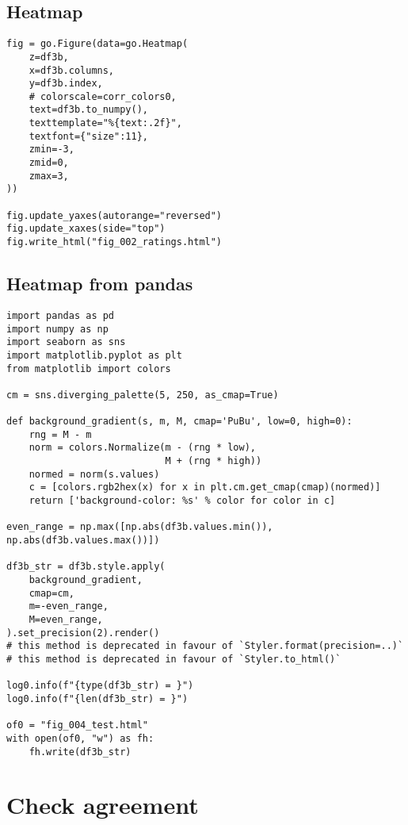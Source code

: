\documentclass[a4paper,10pt,onecolumn,oneside,openright]{article}
\begin{document}
\subsection{Heatmap}
\label{sec:org2fe0089}
\begin{verbatim}
fig = go.Figure(data=go.Heatmap(
    z=df3b,
    x=df3b.columns,
    y=df3b.index,
    # colorscale=corr_colors0,
    text=df3b.to_numpy(),
    texttemplate="%{text:.2f}",
    textfont={"size":11},
    zmin=-3,
    zmid=0,
    zmax=3,
))

fig.update_yaxes(autorange="reversed")
fig.update_xaxes(side="top")
fig.write_html("fig_002_ratings.html")

\end{verbatim}
\subsection{Heatmap from pandas}
\label{sec:org844de83}
\begin{verbatim}
import pandas as pd
import numpy as np
import seaborn as sns
import matplotlib.pyplot as plt
from matplotlib import colors

cm = sns.diverging_palette(5, 250, as_cmap=True)

def background_gradient(s, m, M, cmap='PuBu', low=0, high=0):
    rng = M - m
    norm = colors.Normalize(m - (rng * low),
                            M + (rng * high))
    normed = norm(s.values)
    c = [colors.rgb2hex(x) for x in plt.cm.get_cmap(cmap)(normed)]
    return ['background-color: %s' % color for color in c]

even_range = np.max([np.abs(df3b.values.min()), np.abs(df3b.values.max())])

df3b_str = df3b.style.apply(
    background_gradient,
    cmap=cm,
    m=-even_range,
    M=even_range,
).set_precision(2).render()
# this method is deprecated in favour of `Styler.format(precision=..)`
# this method is deprecated in favour of `Styler.to_html()`

log0.info(f"{type(df3b_str) = }")
log0.info(f"{len(df3b_str) = }")

of0 = "fig_004_test.html"
with open(of0, "w") as fh:
    fh.write(df3b_str)

\end{verbatim}
\section{Check agreement}
\label{sec:orgfc58251}
\end{document}
